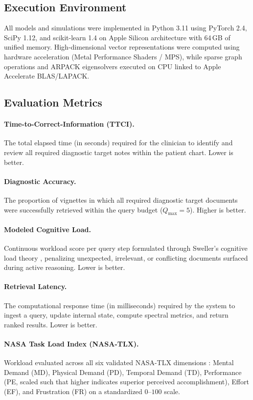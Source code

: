 \documentclass[10pt, onecolumn]{article}
\begin{document}
\subsection{Execution Environment}
All models and simulations were implemented in Python 3.11 using PyTorch 2.4, SciPy 1.12, and scikit-learn 1.4 on Apple Silicon architecture with 64\,GB of unified memory. High-dimensional vector representations were computed using hardware acceleration (Metal Performance Shaders / MPS), while sparse graph operations and ARPACK eigensolvers executed on CPU linked to Apple Accelerate BLAS/LAPACK.

\subsection{Evaluation Metrics}

\paragraph{Time-to-Correct-Information (TTCI).}
The total elapsed time (in seconds) required for the clinician to identify and review all required diagnostic target notes within the patient chart. Lower is better.

\paragraph{Diagnostic Accuracy.}
The proportion of vignettes in which all required diagnostic target documents were successfully retrieved within the query budget ($Q_{\max} = 5$). Higher is better.

\paragraph{Modeled Cognitive Load.}
Continuous workload score per query step formulated through Sweller's cognitive load theory \cite{sweller1988cognitive}, penalizing unexpected, irrelevant, or conflicting documents surfaced during active reasoning. Lower is better.

\paragraph{Retrieval Latency.}
The computational response time (in milliseconds) required by the system to ingest a query, update internal state, compute spectral metrics, and return ranked results. Lower is better.

\paragraph{NASA Task Load Index (NASA-TLX).}
Workload evaluated across all six validated NASA-TLX dimensions \cite{hart1988development,tubbs2020balancing}: Mental Demand (MD), Physical Demand (PD), Temporal Demand (TD), Performance (PE, scaled such that higher indicates superior perceived accomplishment), Effort (EF), and Frustration (FR) on a standardized $0$--$100$ scale.
\end{document}
